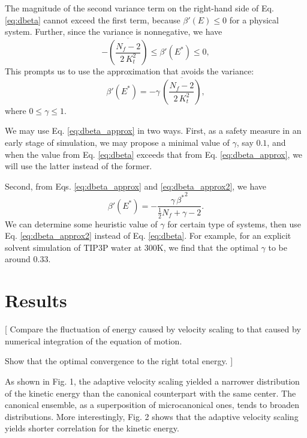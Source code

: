 \documentclass[reprint]{revtex4-1}
\begin{document}
The magnitude of the second variance term on the right-hand side
of Eq. \eqref{eq:dbeta}
cannot exceed the first term,
because $\beta'(E) \le 0$ for a physical system.
%
Further, since the variance is nonnegative, we have
%
\begin{equation*}
  - \overline{
    \left(
      \frac{ N_f - 2 }
           { 2 \, K_t^2 }
    \right)
    }
  \le
  \beta'(E^*)
  \le
  0,
\end{equation*}
%
This prompts us to use the approximation
that avoids the variance:
%
\begin{equation}
  \beta'(E^*)
  =
  -\gamma \, \overline{
    \left(
      \frac{ N_f - 2 }
           { 2 \, K_t^2 }
    \right)
    }
  ,
  \label{eq:dbeta_approx}
\end{equation}
%
where $0 \le \gamma \le 1$.


We may use Eq. \eqref{eq:dbeta_approx} in two ways.
%
First, as a safety measure in an early stage of simulation,
we may propose a minimal value of $\gamma$, say $0.1$,
and when the value from Eq. \eqref{eq:dbeta}
exceeds that from Eq. \eqref{eq:dbeta_approx},
we will use the latter instead of the former.

Second, from
Eqs. \eqref{eq:dbeta_approx} and \eqref{eq:dbeta_approx2},
we have
%
\begin{equation}
  \beta'(E^*)
  =
  -\frac{ \gamma \, {\beta^*}^2 }
  { \frac{1}{2} N_f + \gamma - 2 }
  .
  \label{eq:dbeta_approx2}
\end{equation}
%
We can determine some heuristic value of $\gamma$
for certain type of systems,
then use Eq. \eqref{eq:dbeta_approx2}
instead of Eq. \eqref{eq:dbeta}.
%
For example,
for an explicit solvent simulation of TIP3P water\cite{jorgensen1983}
at 300K, we find that the optimal $\gamma$
to be around $0.33$.



\section{Results}


[
Compare the fluctuation of energy caused by velocity scaling to
that caused by numerical integration of the equation of motion.


Show that the optimal convergence to the right total energy.
]

As shown in Fig. 1,
the adaptive velocity scaling yielded a narrower distribution
of the kinetic energy than the canonical counterpart
with the same center.
%
The canonical ensemble, as a superposition
of microcanonical ones,
tends to broaden distributions.
%
More interestingly,
Fig. 2 shows that the adaptive velocity scaling
yields shorter correlation for the kinetic energy.
\end{document}
